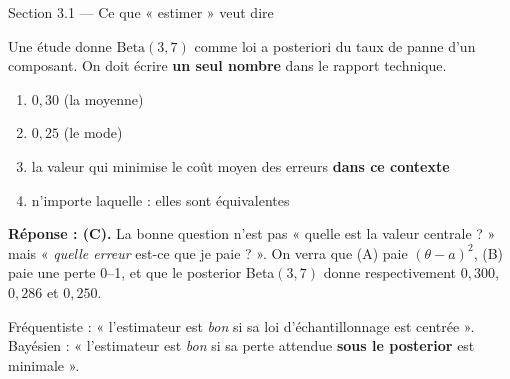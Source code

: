 \begin{frame}{Section 3.1 --- Ce que « estimer » veut dire}
\begin{qbox}
Une étude donne $\mathrm{Beta}(3,7)$ comme loi a posteriori du taux de panne d'un
composant. On doit écrire \textbf{un seul nombre} dans le rapport technique.
\begin{enumerate}
  \item[(A)] $0{,}30$ (la moyenne)
  \item[(B)] $0{,}25$ (le mode)
  \item[(C)] la valeur qui minimise le coût moyen des erreurs \textbf{dans ce contexte}
  \item[(D)] n'importe laquelle : elles sont équivalentes
\end{enumerate}
\vspace{1.5mm}
\textbf{Réponse : (C).} La bonne question n'est pas « quelle est la valeur centrale ? »
mais « \emph{quelle erreur} est-ce que je paie ? ». On verra que (A) paie
$(\theta - a)^2$, (B) paie une perte 0--1, et que le posterior Beta$(3,7)$ donne
respectivement $0{,}300$, $0{,}286$ et $0{,}250$.
\end{qbox}
\vspace{1mm}
\begin{ebox}
Fréquentiste : « l'estimateur est \emph{bon} si sa loi d'échantillonnage
est centrée ». Bayésien : « l'estimateur est \emph{bon} si sa perte
attendue \textbf{sous le posterior} est minimale ».
\end{ebox}
\end{frame}

